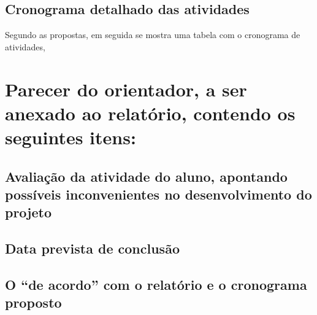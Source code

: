 \documentclass[a4paper, 11pt]{article}
\begin{document}
\subsection{Cronograma detalhado das atividades}
Segundo as propostas, em seguida se mostra uma tabela com o cronograma de atividades,
\begin{table}[H]
\centering
{}
\caption{Cronograma das pr\'oximas etapas.}
\label{tab:cronograma}
\end{table}

\section{Parecer do orientador, a ser anexado ao relatório, contendo os seguintes itens:}

\subsection{Avaliação   da   atividade   do   aluno,   apontando   possíveis   inconvenientes   no desenvolvimento do projeto}
\subsection{Data prevista de conclusão}
\subsection{O “de acordo” com o relatório e o cronograma proposto}
\end{document}
